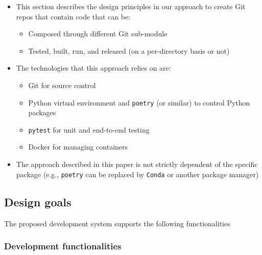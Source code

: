 \begin{itemize}
  \item This section describes the design principles in our approach to
    create Git repos that contain code that can be:

    \begin{itemize}
      \item Composed through different Git sub-module

      \item Tested, built, run, and released (on a per-directory basis
        or not)
    \end{itemize}

  \item The technologies that this approach relies on are:

    \begin{itemize}
      \item Git for source control

      \item Python virtual environment and \texttt{poetry} (or similar)
        to control Python packages

      \item \texttt{pytest} for unit and end-to-end testing

      \item Docker for managing containers
    \end{itemize}

  \item The approach described in this paper is not strictly dependent
    of the specific package (e.g., \texttt{poetry} can be replaced by \texttt{Conda}
    or another package manager)
\end{itemize}

\subsection{Design goals}

The proposed development system supports the following functionalities

\subsubsection{Development functionalities}

